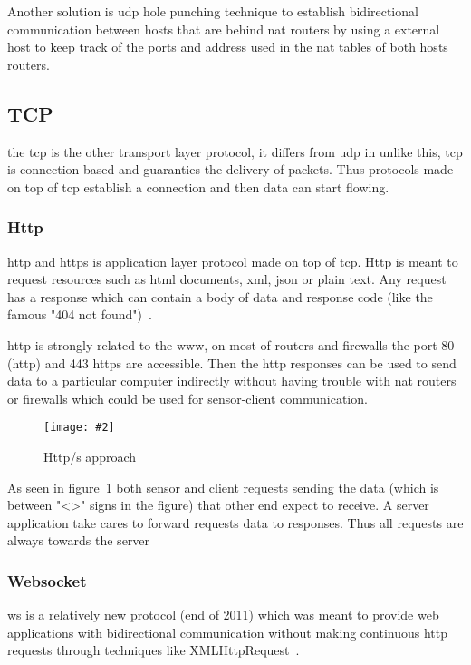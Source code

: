 \documentclass[hidelinks,11pt,a4paper,oneside,article]{memoir}
\newcommand{\putimage}[3][10] %
{
\begin{figure}[h]
	\centering
	\captionsetup{justification=centering}
	\texttt{[image: \#2]}
	\caption{#3}
	\label{fig:#2}
\end{figure}
}
\begin{document}
Another solution is \gls{udp} hole punching technique to establish bidirectional communication between hosts that are behind \gls{nat} routers by using a external host to keep track of the ports and address used in the \gls{nat} tables of both hosts routers.




\subsection{TCP}
the \gls{tcp} is the other transport layer protocol, it differs from \gls{udp} in unlike this, \gls{tcp} is connection based and guaranties the delivery of packets. Thus protocols made on top of \gls{tcp} establish a connection and then data can start flowing.

\subsubsection{Http}\label{sec:http}
\gls{http} and \gls{https} is application layer protocol made on top of \gls{tcp}. Http is meant to request resources such as \gls{html} documents, \gls{xml}, \gls{json} or plain text. Any request has a response which can contain a body of data and response code (like the famous "404 not found")~\cite{http-rfc}.

\gls{http} is strongly related to the \gls{www}, on most of routers and firewalls the port 80 (\gls{http}) and 443 \gls{https} are accessible. Then the \gls{http} responses can be used to send data to a particular computer indirectly without having trouble with \gls{nat} routers or firewalls which could be used for sensor-client communication.

\putimage[14]{http-approach}{Http/s approach}

As seen in figure~\ref{fig:http-approach} both sensor and client requests sending the data (which is between "<>" signs in the figure) that other end expect to receive. A server application take cares to forward requests data to responses. Thus all requests are always towards the server 

\subsubsection{Websocket}
\gls{ws} is a relatively new protocol (end of 2011) which was meant to provide web applications with bidirectional communication without making continuous \gls{http} requests through techniques like XMLHttpRequest~\cite[4]{rfc6455}.
\end{document}
